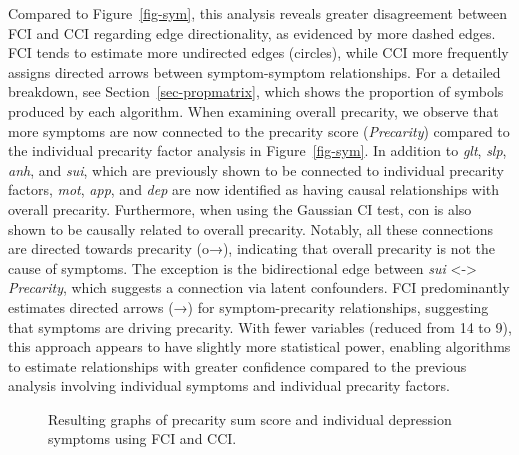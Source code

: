 \documentclass[
]{article}
\begin{document}
Compared to Figure~\ref{fig-sym}, this analysis reveals greater
disagreement between FCI and CCI regarding edge directionality, as
evidenced by more dashed edges. FCI tends to estimate more undirected
edges (circles), while CCI more frequently assigns directed arrows
between symptom-symptom relationships. For a detailed breakdown, see
Section~\ref{sec-propmatrix}, which shows the proportion of symbols
produced by each algorithm. When examining overall precarity, we observe
that more symptoms are now connected to the precarity score
(\emph{Precarity}) compared to the individual precarity factor analysis
in Figure~\ref{fig-sym}. In addition to \emph{glt}, \emph{slp},
\emph{anh}, and \emph{sui}, which are previously shown to be connected
to individual precarity factors, \emph{mot}, \emph{app}, and \emph{dep}
are now identified as having causal relationships with overall
precarity. Furthermore, when using the Gaussian CI test, con is also
shown to be causally related to overall precarity. Notably, all these
connections are directed towards precarity (o→), indicating that overall
precarity is not the cause of symptoms. The exception is the
bidirectional edge between \emph{sui} \textless-\textgreater{}
\emph{Precarity}, which suggests a connection via latent confounders.
FCI predominantly estimates directed arrows (→) for symptom-precarity
relationships, suggesting that symptoms are driving precarity. With
fewer variables (reduced from 14 to 9), this approach appears to have
slightly more statistical power, enabling algorithms to estimate
relationships with greater confidence compared to the previous analysis
involving individual symptoms and individual precarity factors.

\begin{figure}


\caption{\label{fig-presum}Resulting graphs of precarity sum score and
individual depression symptoms using FCI and CCI.}

\end{figure}%
\end{document}
